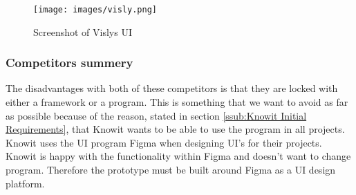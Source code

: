 \begin{figure}[H]
  \centering
  \texttt{[image: images/visly.png]}
  \caption{ Screenshot of Vislys UI }%
  \label{fig:visly}
\end{figure}





\subsubsection{Competitors summery}%
\label{ssub:Comparison}

The disadvantages with both of these competitors is that they are locked with either a framework or a program. This is something that we want to avoid as far as possible because of the reason, stated in section \ref{ssub:Knowit Initial Requirements}, that Knowit wants to be able to use the program in all projects. Knowit uses the UI program Figma when designing UI's for their projects. Knowit is happy with the functionality within Figma and doesn't want to change program. Therefore the prototype must be built around Figma as a UI design platform.




